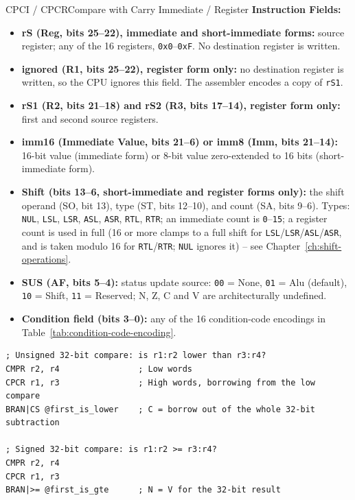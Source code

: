 \begin{instructionbox}{CPCI / CPCR}{Compare with Carry Immediate / Register}
	\textbf{Instruction Fields:}
	\begin{itemize}
		\item \textbf{rS (Reg, bits 25--22), immediate and short-immediate forms:} source register; any of the 16 registers,
		      \texttt{0x0}--\texttt{0xF}. No destination register is written.
		\item \textbf{ignored (R1, bits 25--22), register form only:} no destination register is written, so the CPU ignores
		      this field. The assembler encodes a copy of \texttt{rS1}.
		\item \textbf{rS1 (R2, bits 21--18) and rS2 (R3, bits 17--14), register form only:} first and second source registers.
		\item \textbf{imm16 (Immediate Value, bits 21--6) or imm8 (Imm, bits 21--14):} 16-bit value (immediate form) or 8-bit
		      value zero-extended to 16 bits (short-immediate form).
		\item \textbf{Shift (bits 13--6, short-immediate and register forms only):} the shift operand (SO, bit 13), type (ST, bits 12--10), and count (SA, bits 9--6). Types:
		      \texttt{NUL}, \texttt{LSL},
		      \texttt{LSR}, \texttt{ASL}, \texttt{ASR}, \texttt{RTL}, \texttt{RTR}; an immediate count is
		      \texttt{0}--\texttt{15}; a register count is used in full (16 or more clamps to a full shift for \texttt{LSL}/\texttt{LSR}/\texttt{ASL}/\texttt{ASR}, and is taken modulo 16 for \texttt{RTL}/\texttt{RTR}; \texttt{NUL} ignores it) -- see Chapter~\ref{ch:shift-operations}.
		\item \textbf{SUS (AF, bits 5--4):} status update source: \texttt{00} = None, \texttt{01} = Alu (default), \texttt{10} = Shift, \texttt{11} =
		      Reserved; N, Z, C and V are architecturally undefined.
		\item \textbf{Condition field (bits 3--0):} any of the 16 condition-code encodings in
		      Table~\ref{tab:condition-code-encoding}.
	\end{itemize}

	\begin{example}
		\begin{lstlisting}
; Unsigned 32-bit compare: is r1:r2 lower than r3:r4?
CMPR r2, r4                ; Low words
CPCR r1, r3                ; High words, borrowing from the low compare
BRAN|CS @first_is_lower    ; C = borrow out of the whole 32-bit subtraction

; Signed 32-bit compare: is r1:r2 >= r3:r4?
CMPR r2, r4
CPCR r1, r3
BRAN|>= @first_is_gte      ; N = V for the 32-bit result
		\end{lstlisting}
		\caption{32-bit Comparison with Borrow Propagation}
	\end{example}


\end{instructionbox}

